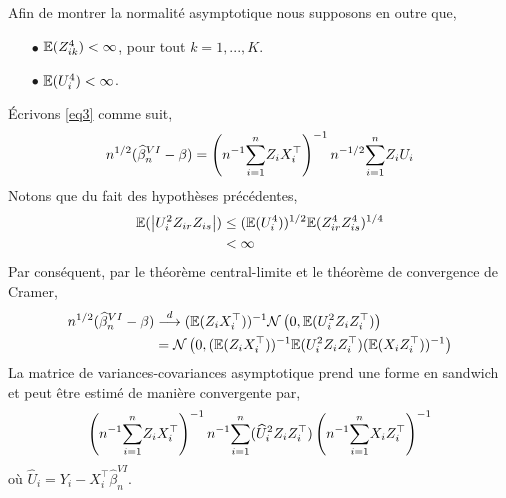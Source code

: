 \documentclass[12pt, reqno]{amsart}
\begin{document}
Afin de montrer la normalité asymptotique nous supposons en outre que,
\begin{itemize}
\item[$\bullet$] $\mathbb{E}(Z_{ik}^4) < \infty$, pour tout $k=1,...,K$. 
\item[$\bullet$] $\mathbb{E}(U_i^4)<\infty$.
\end{itemize}
\'Ecrivons \eqref{eq3} comme suit,
\begin{align*}
n^{1/2}(\widehat{\beta}_n^{VI} - \beta ) = \left(n^{-1}\underset{i=1}{\overset{n}{\sum}} Z_iX_i^\top\right)^{-1}n^{-1/2} \underset{i=1}{\overset{n}{\sum}} Z_iU_i
\end{align*}
Notons que du fait des hypothèses précédentes,
\begin{align*}
\mathbb{E}(\left\vert {U_i^2Z_{ir}Z_{is}} \right\vert) &\leq (\mathbb{E}(U_i^4))^{1/2}\mathbb{E}(Z_{ir}^4Z_{is}^4)^{1/4}\\
& < \infty
\end{align*}
Par conséquent, par le théorème central-limite et le théorème de convergence de Cramer,
\begin{align*}
n^{1/2}(\widehat{\beta}_n^{VI} - \beta ) &\overset{d}{\longrightarrow} (\mathbb{E}(Z_iX_i^\top))^{-1}\mathcal{N}\left(0,\mathbb{E}(U_i^2Z_iZ_i^\top)\right)\\
&=\mathcal{N}\left(0,  (\mathbb{E}(Z_iX_i^\top))^{-1}\mathbb{E}(U_i^2Z_iZ_i^\top) (\mathbb{E}(X_iZ_i^\top))^{-1}\right)
\end{align*}
La matrice de variances-covariances asymptotique prend une forme en sandwich et peut être estimé de manière convergente par,
\begin{align*}
\left(n^{-1}\underset{i=1}{\overset{n}{\sum}} Z_iX_i^\top\right)^{-1} n^{-1} \underset{i=1}{\overset{n}{\sum}} (\widehat{U}_i^2Z_iZ_i^\top) \left(n^{-1}\underset{i=1}{\overset{n}{\sum}} X_iZ_i^\top\right)^{-1}
\end{align*}
où $\widehat{U}_i = Y_i - X_i^\top\widehat{\beta}_n^{VI}$.

%
%
\end{document}
